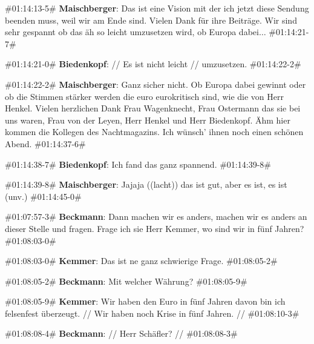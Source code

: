 {\begin{description}
\begin{linenumbers}
		\item \#01:14:13-5\# \textbf{Maischberger}: Das ist eine Vision mit der ich jetzt diese Sendung beenden muss, weil wir am Ende sind. Vielen Dank für ihre Beiträge. Wir sind sehr gespannt ob das äh so leicht umzusetzen wird, ob Europa dabei$\ldots$ \#01:14:21-7\#
		
		\item \#01:14:21-0\# \textbf{Biedenkopf}: // Es ist nicht leicht // umzusetzen.  \#01:14:22-2\# 
		
		\item \#01:14:22-2\# \textbf{Maischberger}: Ganz sicher nicht. Ob Europa dabei gewinnt oder ob die Stimmen stärker werden die euro eurokritisch sind, wie die von Herr Henkel. Vielen herzlichen Dank Frau Wagenknecht, Frau Ostermann das sie bei uns waren, Frau von der Leyen, Herr Henkel und Herr Biedenkopf. Ähm hier kommen die Kollegen des Nachtmagazins. Ich wünsch' ihnen noch einen schönen Abend. \#01:14:37-6\#
		
		\item \#01:14:38-7\# \textbf{Biedenkopf}: Ich fand das ganz spannend. \#01:14:39-8\# 
		
		\item \#01:14:39-8\# \textbf{Maischberger}: Jajaja ((lacht)) das ist gut, aber es ist, es ist (unv.)  \#01:14:45-0\#
	\end{linenumbers}
	\label{lis:35}
\end{description}

\begin{description}
	\begin{linenumbers}
		\item \#01:07:57-3\# \textbf{Beckmann}: Dann machen wir es anders, machen wir es anders an dieser Stelle und fragen. Frage ich sie Herr Kemmer, wo sind wir in fünf Jahren? \#01:08:03-0\# 
		
		\item \#01:08:03-0\# \textbf{Kemmer}: Das ist ne ganz schwierige Frage. \#01:08:05-2\# 
		
		\item \#01:08:05-2\# \textbf{Beckmann}: Mit welcher Währung? \#01:08:05-9\# 
		
		\item \#01:08:05-9\# \textbf{Kemmer}: Wir haben den Euro in fünf Jahren davon bin ich felsenfest überzeugt. // Wir haben noch Krise in fünf Jahren. // \#01:08:10-3\# 
		
		\item \#01:08:08-4\# \textbf{Beckmann}: // Herr Schäfler? // \#01:08:08-3\# 
		

\end{linenumbers}
\end{description}}
